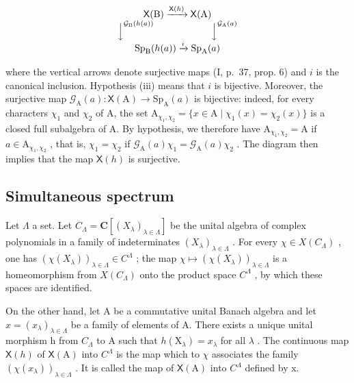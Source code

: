 \[
\begin{array}{c} \mathsf {X} (\mathrm{B}) \xrightarrow {\mathsf {X} (h)} \mathsf {X} (\mathrm{A}) \\ \Big \downarrow^ {\mathcal {G} _ {\mathrm{B}} (h (a))} \qquad \qquad \qquad \Big \downarrow^ {\mathcal {G} _ {\mathrm{A}} (a)} \\ \operatorname{Sp} _ {\mathrm{B}} (h (a)) \xrightarrow {i} \operatorname{Sp} _ {\mathrm{A}} (a) \end{array}
\]

where the vertical arrows denote surjective maps (I, p.~37, prop. 6) and \(i\) is the canonical inclusion. Hypothesis (iii) means that \(i\) is bijective. Moreover, the surjective map \(\mathcal{G}_{\mathrm{A}}(a)\colon \mathsf{X}(\mathrm{A})\to \mathrm{Sp}_{\mathrm{A}}(a)\) is bijective: indeed, for every characters \(\chi_{1}\) and \(\chi_{2}\) of A, the set \(\mathrm{A}_{\chi_1,\chi_2} = \{x\in \mathrm{A}\mid \chi_1(x) = \chi_2(x)\}\) is a closed full subalgebra of A. By hypothesis, we therefore have \(\mathrm{A}_{\chi_1,\chi_2} = \mathrm{A}\) if \(a\in \mathrm{A}_{\chi_1,\chi_2}\) , that is, \(\chi_{1} = \chi_{2}\) if \(\mathcal{G}_{\mathrm{A}}(a)\chi_{1} = \mathcal{G}_{\mathrm{A}}(a)\chi_{2}\) . The diagram then implies that the map \(\mathsf{X}(h)\) is surjective.

\subsection{Simultaneous spectrum}

Let \(\Lambda\) a set. Let \(C_{\Lambda} = \mathbf{C}[(X_{\lambda})_{\lambda \in \Lambda}]\) be the unital algebra of complex polynomials in a family of indeterminates \((X_{\lambda})_{\lambda \in \Lambda}\) . For every \(\chi \in X(C_{\Lambda})\) , one has \((\chi (X_{\lambda}))_{\lambda \in \Lambda} \in C^{\Lambda}\) ; the map \(\chi \mapsto (\chi (X_{\lambda}))_{\lambda \in \Lambda}\) is a homeomorphism from \(X(C_{\Lambda})\) onto the product space \(C^{\Lambda}\) , by which these spaces are identified.

On the other hand, let A be a commutative unital Banach algebra and let \(x = (x_{\lambda})_{\lambda \in \Lambda}\) be a family of elements of A. There exists a unique unital morphism h from \(C_{\Lambda}\) to A such that \(h(\mathrm{X}_{\lambda}) = x_{\lambda}\) for all \(\lambda\) . The continuous map \(\mathsf{X}(h)\) of \(\mathsf{X}(\mathrm{A})\) into \(C^{\Lambda}\) is the map which to \(\chi\) associates the family \((\chi(x_{\lambda}))_{\lambda \in \Lambda}\) . It is called the map of \(\mathsf{X}(\mathrm{A})\) into \(C^{\Lambda}\) defined by x.

